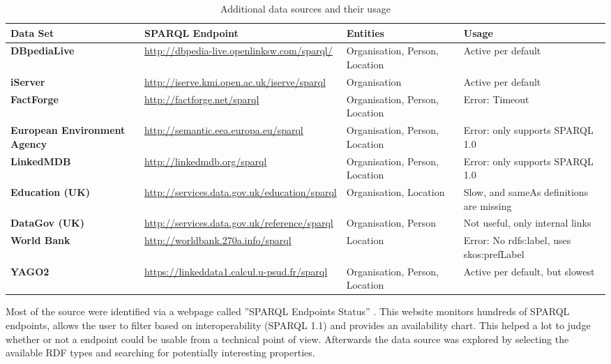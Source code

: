 \begin{table}[H]
	\begin{tabular*}{\textwidth}{p{}|p{}|p{} |p{3cm}}
		
		\textbf{Data Set} &\small \textbf{SPARQL Endpoint} & \textbf{Entities} & \textbf{Usage}  \\
		\hline 
		\textbf{DBpediaLive} &\small \url{http://dbpedia-live.openlinksw.com/sparql/} & Organisation, Person, Location  & Active per default\\
		\hline 
		\textbf{iServer} &\small \url{http://iserve.kmi.open.ac.uk/iserve/sparql} & Organisation & Active per default \\
		\hline 
		\textbf{FactForge} &\small \url{http://factforge.net/sparql} & Organisation, Person, Location & Error: Timeout \\
		\hline 
		\textbf{European Environment Agency} &\small \url{http://semantic.eea.europa.eu/sparql} &  Organisation, Person, Location  & Error: only supports SPARQL 1.0  \\
		\hline   
		\textbf{LinkedMDB} &\small \url{http://linkedmdb.org/sparql} &  Organisation, Person, Location  & Error: only supports SPARQL 1.0 \\
		\hline 
		\textbf{Education (UK)} & \small \url{http://services.data.gov.uk/education/sparql} &  Organisation, Location  & Slow, and sameAs definitions are missing \\
		\hline 
		\textbf{DataGov (UK)} &\small \url{http://services.data.gov.uk/reference/sparql} &  Organisation, Person  & Not useful, only internal links\\
		\hline 
		\textbf{World Bank} &\small \url{http://worldbank.270a.info/sparql} &  Location & Error: No rdfs:label, uses skos:prefLabel \\
		\hline 
		\textbf{YAGO2} &\small \url{https://linkeddata1.calcul.u-psud.fr/sparql} &  Organisation, Person, Location & Active per default, but slowest \\
	\end{tabular*}
	\caption{Additional data sources and their usage}
	\label{tab:sources}
\end{table}

Most of the source were identified via a webpage called ''SPARQL Endpoints Status'' \cite{pierre-yves_vandenbussche_sparql_2013}. This website monitors hundreds of SPARQL endpoints, allows the user to filter based on interoperability (SPARQL 1.1) and provides an availability chart. This helped a lot to judge whether or not a endpoint could be usable from a technical point of view. Afterwards the data source was explored by selecting the available RDF types and searching for potentially interesting properties. 















